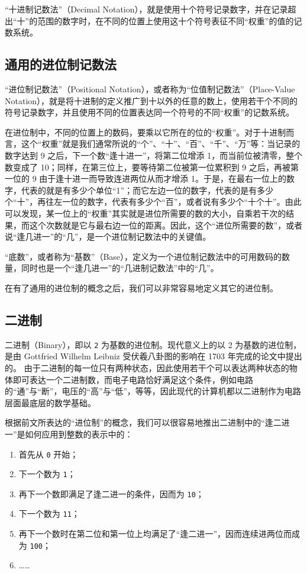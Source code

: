         “十进制记数法”（Decimal Notation），就是使用十个符号记录数字，并在记录超出“十”的范围的数字时，在不同的位置上使用这十个符号表征不同“权重”的值的记数系统。

    \subsection{通用的进位制记数法}\label{subsec:NumberSystemBasics/PositionalNotation/Common}
        “进位制记数法”（Positional Notation），或者称为“位值制记数法”（Place-Value Notation），就是将十进制的定义推广到十以外的任意的数上，使用若干个不同的符号记录数字，并且使用不同的位置表达同一个符号的不同“权重”的记数系统。

        在进位制中，不同的位置上的数码，要乘以它所在的位的“权重”。对于十进制而言，这个“权重”就是我们通常所说的“个”、“十”、“百”、“千”、“万”等：当记录的数字达到 9 之后，下一个数“逢十进一”，将第二位增添 1，而当前位被清零，整个数变成了 10；同样，在第三位上，要等待第二位被第一位累积到 9 之后，再被第一位的 9 由于逢十进一而导致连进两位从而才增添 1。于是，在最右一位上的数字，代表的就是有多少个单位“1”；而它左边一位的数字，代表的是有多少个“十”，再往左一位的数字，代表有多少个“百”，或者说有多少个“十个十”。由此可以发现，某一位上的“权重”其实就是进位所需要的数的大小，自乘若干次的结果，而这个次数就是它与最右边一位的距离。因此，这个“进位所需要的数”，或者说“逢几进一”的“几”，是一个进位制记数法中的关键值。

        “底数”，或者称为“基数”（Base），定义为一个进位制记数法中的可用数码的数量，同时也是一个“逢几进一”的“几进制记数法”中的“几”。

        在有了通用的进位制的概念之后，我们可以非常容易地定义其它的进位制。

    \subsection{二进制}\label{subsec:NumberSystemBasics/PositionalNotation/Binary}
        二进制（Binary），即以 \texttt{2} 为基数的进位制。现代意义上的以 2 为基数的进位制，是由 Gottfried Wilhelm Leibniz 受伏羲八卦图的影响在 1703 年完成的论文\cite{leibniz-binary}中提出的。
        由于二进制的每一位只有两种状态，因此使用若干个可以表达两种状态的物体即可表达一个二进制数，而电子电路恰好满足这个条件，例如电路的“通”与“断”，电压的“高”与“低”，等等，因此现代的计算机都以二进制作为电路层面最底层的数学基础。

        根据前文所表达的“进位制”的概念，我们可以很容易地推出二进制中的“逢二进一”是如何应用到整数的表示中的：
        \begin{enumerate}[start = 0]
            \item 首先从 \texttt{0} 开始；
            \item 下一个数为 \texttt{1}；
            \item 再下一个数即满足了逢二进一的条件，因而为 \texttt{10}；
            \item 下一个数为 \texttt{11}；
            \item 再下一个数时在第二位和第一位上均满足了“逢二进一”，因而连续进两位而成为 \texttt{100}；
            \item ……
        \end{enumerate}

